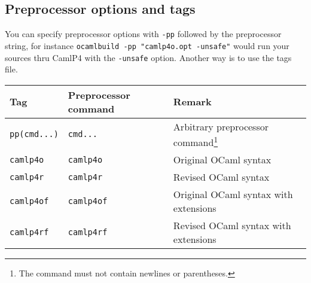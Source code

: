\documentclass[9pt]{article}
\begin{document}
\subsection{Preprocessor options and tags}
You can specify preprocessor options with \texttt{-pp} followed by the
preprocessor string, for instance \texttt{ocamlbuild -pp "camlp4o.opt -unsafe"}
would run your sources thru CamlP4 with the \texttt{-unsafe} option.
Another way is to use the tags file.  
\begin{center}
  \begin{tabular}{|l|l|l|}
    \hline
    \textbf{Tag}        & \textbf{Preprocessor command} & \textbf{Remark} \\
    \hline
    \hline
    \texttt{pp(cmd...)} & \texttt{cmd...}               & Arbitrary
        preprocessor command\footnote{The command must not contain newlines or parentheses.} \\
    \hline
    \texttt{camlp4o}    & \texttt{camlp4o}              & Original OCaml syntax \\
    \hline
    \texttt{camlp4r}    & \texttt{camlp4r}              & Revised OCaml syntax \\
    \hline
    \texttt{camlp4of}   & \texttt{camlp4of}             & Original OCaml syntax with extensions \\
    \hline
    \texttt{camlp4rf}   & \texttt{camlp4rf}             & Revised OCaml syntax with extensions \\
    \hline
  \end{tabular}
\end{center}
\end{document}
